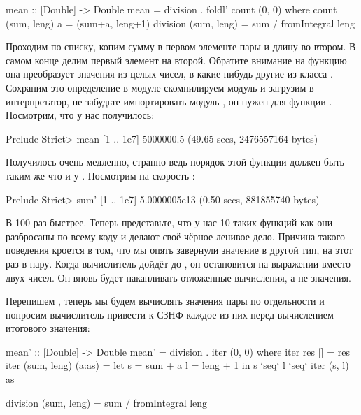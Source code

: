 \begin{code}
mean :: [Double] -> Double
mean = division . foldl' count (0, 0)
    where count  (sum, leng) a = (sum+a, leng+1)
          division (sum, leng) = sum / fromIntegral leng
\end{code}

Проходим по списку, копим сумму в первом элементе пары и длину во
втором. В самом конце делим первый элемент на второй. Обратите внимание
на функцию  она преобразует значения из целых чисел, в
какие-нибудь другие из класса . Сохраним это определение в
модуле  скомпилируем модуль и загрузим в интерпретатор, не
забудьте импортировать модуль , он нужен для функции
. Посмотрим, что у нас получилось:


\begin{code}
Prelude Strict> mean [1 .. 1e7]
5000000.5
(49.65 secs, 2476557164 bytes)
\end{code}

Получилось очень медленно, странно ведь порядок этой функции должен быть
таким же что и у . Посмотрим на скорость :


\begin{code}
Prelude Strict> sum' [1 .. 1e7]
5.0000005e13
(0.50 secs, 881855740 bytes)
\end{code}

В 100 раз быстрее. Теперь представьте, что у нас 10 таких функций как
 они разбросаны по всему коду и делают своё чёрное ленивое
дело. Причина такого поведения кроется в том, что мы опять завернули
значение в другой тип, на этот раз в пару. Когда вычислитель дойдёт до
, он остановится на выражении  вместо двух
чисел. Он вновь будет накапливать отложенные вычисления, а не значения.

Перепишем , теперь мы будем вычислять значения пары по
отдельности и попросим вычислитель привести к СЗНФ каждое из них перед
вычислением итогового значения:


\begin{code}
mean' :: [Double] -> Double
mean' = division . iter (0, 0)
    where iter res          []      = res
          iter (sum, leng)  (a:as)  = 
                let s = sum  + a
                    l = leng + 1
                in  s `seq` l `seq` iter (s, l) as
          
          division (sum, leng) = sum / fromIntegral leng
\end{code}

